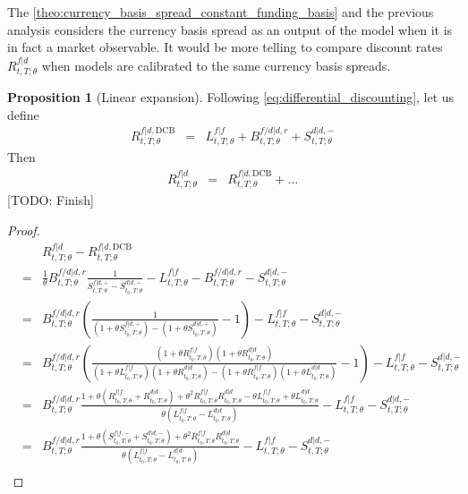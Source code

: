 \documentclass[11pt,english]{amsart}
\newcommand{\DCB}{\mathrm{DCB}}
\theoremstyle{definition}
\newtheorem{prop}{Proposition}
\begin{document}
The \autoref{theo:currency_basis_spread_constant_funding_basis} and the previous analysis considers the currency basis spread as an output of the model when it is in fact a market observable. It would be more telling to compare discount rates $R^{f|d}_{t,T;\theta}$ when models are calibrated to the same currency basis spreads. 

\begin{prop}[Linear expansion]
Following \autoref{eq:differential_discounting}, let us define  
\begin{eqnarray*}
	R^{f|d,\DCB}_{t,T;\theta} &=&  L^{f|f}_{t,T;\theta} + B^{f/d|d,r}_{t,T;\theta} + S^{d|d,-}_{t,T;\theta}
\end{eqnarray*} 
Then 
\begin{eqnarray*}
	R^{f|d}_{t,T;\theta}  &=& R^{f|d,\DCB}_{t,T;\theta} + \ldots  
\end{eqnarray*} 
[TODO: Finish]
\end{prop}

\begin{proof}
\begin{eqnarray*}
   &  & R^{f|d}_{t,T;\theta} - R^{f|d,\DCB}_{t,T;\theta} \\
   &=& \frac{1}{\theta}B^{f/d|d,r}_{t,T;\theta}\frac{1}{ S^{f|d,\div}_{t,T;\theta} - S^{d|d,\div}_{t_0,T;\theta} }  -  L^{f|f}_{t,T;\theta} - B^{f/d|d,r}_{t,T;\theta}  - S^{d|d,-}_{t,T;\theta} \\
   &=& B^{f/d|d,r}_{t,T;\theta}\left( \frac{1}{ (1+\theta S^{f|d,\div}_{t_0,T;\theta}) - (1+\theta S^{d|d,\div}_{t_0,T;\theta}) }  - 1 \right)  - L^{f|f}_{t,T;\theta} - S^{d|d,-}_{t,T;\theta} \\
   &=& B^{f/d|d,r}_{t,T;\theta} \left(\frac{(1+\theta R^{f|f}_{t_0,T;\theta})(1+\theta R^{d|d}_{t_0,T;\theta}) }{ (1+\theta L^{f|f}_{t_0,T;\theta})(1+\theta R^{d|d}_{t_0,T;\theta}) - (1+\theta R^{f|f}_{t_0,T;\theta})(1+\theta L^{d|d}_{t_0,T;\theta}) } - 1 \right)   -  L^{f|f}_{t,T;\theta} - S^{d|d,-}_{t,T;\theta} \\
   &=& B^{f/d|d,r}_{t,T;\theta} \frac{1 + \theta ( R^{f|f}_{t_0,T;\theta}+ R^{d|d}_{t_0,T;\theta}) + \theta^2  R^{f|f}_{t_0,T;\theta}  R^{d|d}_{t_0,T;\theta} - \theta L^{f|f}_{t_0,T;\theta} + \theta L^{d|d}_{t_0,T;\theta}}{  \theta (L^{f|f}_{t_0,T;\theta} - L^{d|d}_{t_0,T;\theta})  }   -  L^{f|f}_{t,T;\theta} - S^{d|d,-}_{t,T;\theta} \\
   &=& B^{f/d|d,r}_{t,T;\theta} \frac{1 + \theta ( S^{f|f,-}_{t_0,T;\theta}+ S^{d|d,-}_{t_0,T;\theta}) + \theta^2  R^{f|f}_{t_0,T;\theta}  R^{d|d}_{t_0,T;\theta} }{  \theta (L^{f|f}_{t_0,T;\theta} - L^{d|d}_{t_0,T;\theta})  }  -  L^{f|f}_{t,T;\theta} - S^{d|d,-}_{t,T;\theta} \\
\end{eqnarray*} 
\end{proof}
\end{document}
